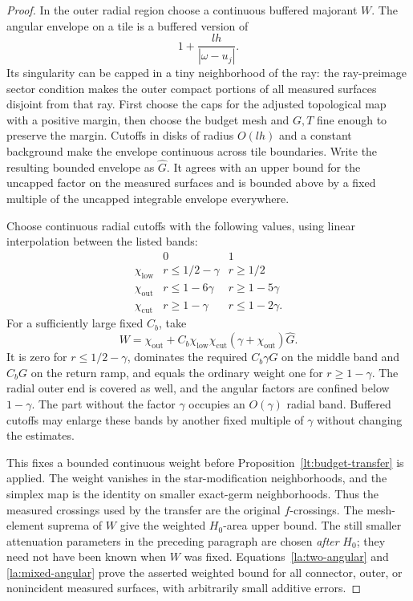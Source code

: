 \begin{proof}
In the outer radial region choose a continuous buffered majorant
$W$.  The angular envelope on a tile is a buffered version of
\[
 1+\frac{lh}{|\omega-u_j|}.
\]
Its singularity can be capped in a tiny neighborhood of the ray:
the ray-preimage sector condition makes the outer compact portions
of all measured surfaces disjoint from that ray.  First choose the
caps for the adjusted topological map with a positive margin, then
choose the budget mesh and $G,T$ fine enough to preserve the margin.
Cutoffs in disks of radius $O(lh)$ and a constant background make
the envelope continuous across tile boundaries.  Write the resulting
bounded envelope as $\widehat G$.  It agrees with an upper bound for
the uncapped factor on the measured surfaces and is bounded above
by a fixed multiple of the uncapped integrable envelope everywhere.

Choose continuous radial cutoffs with the following values, using
linear interpolation between the listed bands:
\[
\begin{array}{c|cc}
 &0&1\\ \hline
 \chi_{\mathrm{low}}&r\le1/2-\gamma&r\ge1/2\\
 \chi_{\mathrm{out}}&r\le1-6\gamma&r\ge1-5\gamma\\
 \chi_{\mathrm{cut}}&r\ge1-\gamma&r\le1-2\gamma.
\end{array}
\]
For a sufficiently large fixed $C_b$, take
\begin{equation}\label{la:outer-weight}
 W=\chi_{\mathrm{out}}+
   C_b\chi_{\mathrm{low}}\chi_{\mathrm{cut}}
             (\gamma+\chi_{\mathrm{out}})\widehat G.
\end{equation}
It is zero for $r\le1/2-\gamma$, dominates the required
$C_b\gamma G$ on the middle band and $C_bG$ on the return ramp,
and equals the ordinary weight one for $r\ge1-\gamma$.
The radial outer end is covered as well, and the angular factors
are confined below $1-\gamma$.  The part without the factor $\gamma$ occupies an
$O(\gamma)$ radial band.  Buffered cutoffs may enlarge these bands
by another fixed multiple of $\gamma$ without changing the estimates.

This fixes a bounded continuous weight before
Proposition~\ref{lt:budget-transfer} is applied.  The weight vanishes in
the star-modification neighborhoods, and the simplex map is the
identity on smaller exact-germ neighborhoods.  Thus the measured
crossings used by the transfer are the original $f$-crossings.  The
mesh-element suprema of $W$ give the weighted $H_0$-area upper bound.
The still smaller attenuation parameters in the preceding paragraph
are chosen \emph{after} $H_0$; they need not have been known when $W$
was fixed.  Equations~\eqref{la:two-angular} and
\eqref{la:mixed-angular} prove the asserted weighted bound for all
connector, outer, or nonincident measured surfaces, with arbitrarily
small additive errors.


\end{proof}
